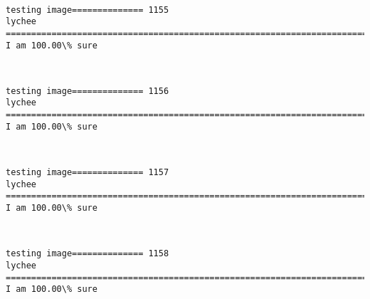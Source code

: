 \documentclass[11pt]{article}
\begin{document}
    \begin{center}
    \end{center}
    { \hspace*{\fill} \\}
    
    \begin{Verbatim}[commandchars=\\\{\}]
testing image============== 1155
lychee
============================================================================
I am 100.00\% sure

    \end{Verbatim}

    \begin{center}
    \end{center}
    { \hspace*{\fill} \\}
    
    \begin{Verbatim}[commandchars=\\\{\}]
testing image============== 1156
lychee
============================================================================
I am 100.00\% sure

    \end{Verbatim}

    \begin{center}
    \end{center}
    { \hspace*{\fill} \\}
    
    \begin{Verbatim}[commandchars=\\\{\}]
testing image============== 1157
lychee
============================================================================
I am 100.00\% sure

    \end{Verbatim}

    \begin{center}
    \end{center}
    { \hspace*{\fill} \\}
    
    \begin{Verbatim}[commandchars=\\\{\}]
testing image============== 1158
lychee
============================================================================
I am 100.00\% sure

    \end{Verbatim}
\end{document}
